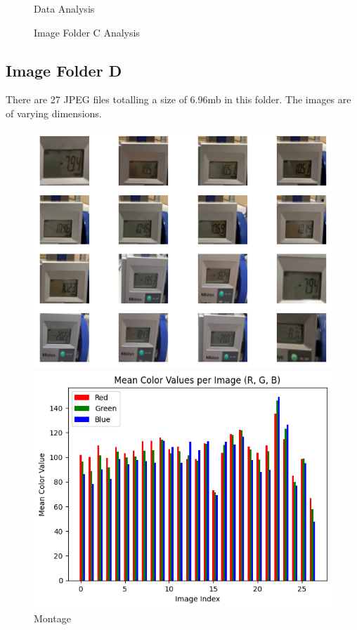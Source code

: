 \begin{figure}[ht]
\begin{minipage}[t]{0.50\textwidth}
        \caption*{Data Analysis}
    \end{minipage}
    \caption{Image Folder C Analysis}
    \label{fig:Image Folder C Analysis}
\end{figure}


\subsection{Image Folder D}

There are 27 JPEG files totalling a size of 6.96mb in this folder. The images are of varying dimensions.

\begin{figure}[ht]
    \centering
    \begin{minipage}[t]{0.25\textwidth}
        \centering
        \includegraphics[width=\textwidth]{Figures/EDA_Charts/5/montage.png}
        \caption*{Montage}
    \end{minipage}\hfill
    \begin{minipage}[t]{0.25\textwidth}
        \centering
        \includegraphics[width=\textwidth]{Figures/EDA_Charts/5/rgb.png}

\end{minipage}
\end{figure}
